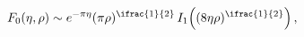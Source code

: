 \[\mathop{F_{0}\/}\nolimits\!\left(\eta,\rho\right)\sim e^{-\pi\eta}(\pi\rho)^{%
\ifrac{1}{2}}\mathop{I_{1}\/}\nolimits\!\left((8\eta\rho)^{\ifrac{1}{2}}\right),\]